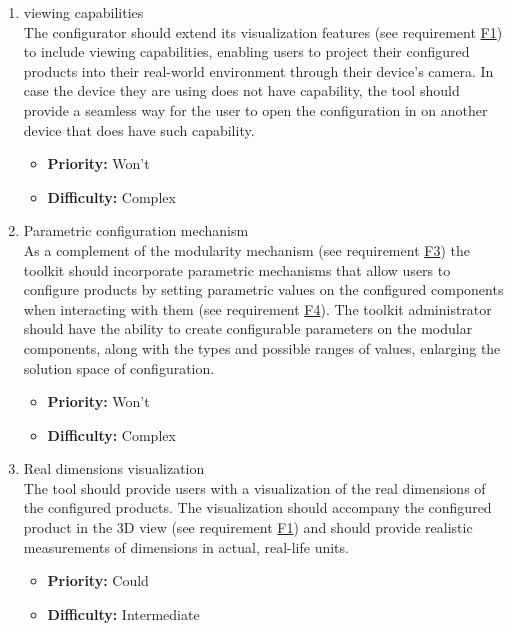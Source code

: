 \begin{enumerate}[label=\textbf{F\arabic*:}, leftmargin=*]
\item \label{itm:F19}  viewing capabilities
\vspace{2pt}
\\The configurator should extend its visualization features (see requirement \hyperref[itm:F1]{F1}) to include  viewing capabilities, enabling users to project their configured products into their real-world environment through their device's camera. In case the device they are using does not have  capability, the tool should provide a seamless way for the user to open the configuration in  on another device that does have such capability.
\begin{itemize}[noitemsep, label=\trianglebullet]
    \item \textbf{Priority:} Won't
    \item \textbf{Difficulty:} Complex
\end{itemize}
\vspace{4pt}

\item \label{itm:F20} Parametric configuration mechanism
\vspace{2pt}
\\As a complement of the modularity mechanism (see requirement \hyperref[itm:F3]{F3}) the toolkit should incorporate parametric mechanisms that allow users to configure products by setting parametric values on the configured components when interacting with them (see requirement \hyperref[itm:F4]{F4}). The toolkit administrator should have the ability to create configurable parameters on the modular components, along with the types and possible ranges of values, enlarging the solution space of configuration.
\begin{itemize}[noitemsep, label=\trianglebullet]
    \item \textbf{Priority:} Won't
    \item \textbf{Difficulty:} Complex
\end{itemize}
\vspace{4pt}

\item \label{itm:F21} Real dimensions visualization
\vspace{2pt}
\\The tool should provide users with a visualization of the real dimensions of the configured products. The visualization should accompany the configured product in the 3D view (see requirement \hyperref[itm:F1]{F1}) and should provide realistic measurements of dimensions in actual, real-life units.
\begin{itemize}[noitemsep, label=\trianglebullet]
    \item \textbf{Priority:} Could
    \item \textbf{Difficulty:} Intermediate
\end{itemize}

\end{enumerate}


